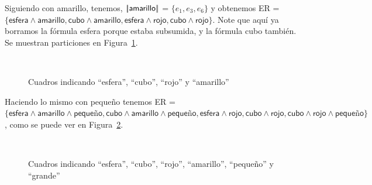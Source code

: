 Siguiendo con \textsf{amarillo}, tenemos, $|\!|\textsf{amarillo}|\!|$ = $\{e_1, e_3, e_6\}$ y obtenemos ER = $\{\textsf{esfera} \wedge \textsf{amarillo}, \textsf{cubo} \wedge \textsf{amarillo}, \textsf{esfera} \wedge \textsf{rojo}, \textsf{cubo} \wedge \textsf{rojo}\}$. 
Note que aqu\'i ya borramos la f\'ormula \textsf{esfera} porque estaba subsumida, y la f\'ormula \textsf{cubo} tambi\'en. Se muestran particiones en Figura~\ref{fig-modelo10}.

\begin{figure}[ht]
\begin{center}
\\[0pt]
\caption{Cuadros indicando ``esfera'', ``cubo'', ``rojo'' y ``amarillo''}
\label{fig-modelo10}
\end{center}
\end{figure}

Haciendo lo mismo con \textsf{peque\~no} tenemos ER = $\{\textsf{esfera} \wedge \textsf{amarillo} \wedge \textsf{peque\~no}, \textsf{cubo} \wedge \textsf{amarillo} \wedge \textsf{peque\~no}, \textsf{esfera} \wedge \textsf{rojo}, \textsf{cubo} \wedge \textsf{rojo}, \textsf{cubo} \wedge \textsf{rojo} \wedge \textsf{peque\~no}\}$, como se puede ver en Figura~\ref{fig-modelo11}.
\begin{figure}[ht]
\begin{center}
\\[0pt]
\caption{Cuadros indicando ``esfera'', ``cubo'', ``rojo'', ``amarillo'', ``peque\~no'' y ``grande''}
\label{fig-modelo11}
\end{center}
\end{figure}

